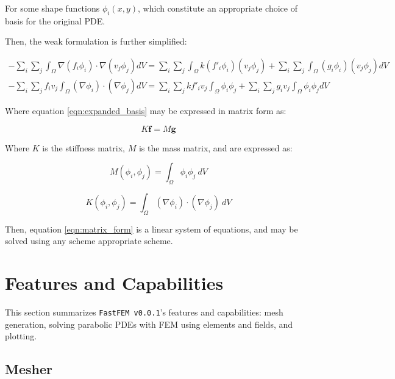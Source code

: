 \documentclass[headings=standardclasses, abstract=true]{scrartcl}
\begin{document}
For some shape functions $\phi_i(x,y)$, which constitute an appropriate choice of basis for the original PDE.

Then, the weak formulation is further simplified:

\begin{align}
    - \sum_i \sum_j \int_\Omega \nabla(f_i \phi_i) \cdot \nabla(v_j \phi_j) dV = \sum_i \sum_j \int_\Omega k (f'_i \phi_i) (v_j \phi_j) + \sum_i \sum_j \int_\Omega (g_i \phi_i) (v_j \phi_j) dV \\
    - \sum_i \sum_j f_i v_j \int_\Omega (\nabla \phi_i) \cdot (\nabla \phi_j) dV = \sum_i \sum_j k f'_i v_j \int_\Omega  \phi_i \phi_j+ \sum_i \sum_j g_i v_j \int_\Omega \phi_i \phi_j dV \label{eqn:expanded_basis}
\end{align}

Where equation \ref{eqn:expanded_basis} may be expressed in matrix form as:

\begin{equation}
K \mathbf{f} = M \mathbf{g} \label{eqn:matrix_form}
\end{equation}

Where $K$ is the stiffness matrix, $M$ is the mass matrix, and are expressed as:

\begin{equation}
    M(\phi_i,\phi_j) = \int_{\Omega}\phi_i \phi_j~dV
    \label{eqn:mass_matrix}
\end{equation}

\begin{equation}
    K(\phi_i,\phi_j) = \int_{\Omega}(\nabla\phi_i)\cdot (\nabla\phi_j)~dV
    \label{eqn:stiffness_matrix}
\end{equation}

Then, equation \ref{eqn:matrix_form} is a linear system of equations, and may be solved using any scheme appropriate scheme.

\section{Features and Capabilities}

This section summarizes \texttt{FastFEM v0.0.1}'s features and capabilities: mesh generation, solving parabolic PDEs with FEM using elements and fields, and plotting.

\subsection{Mesher} \label{sec:mesher}
\end{document}

